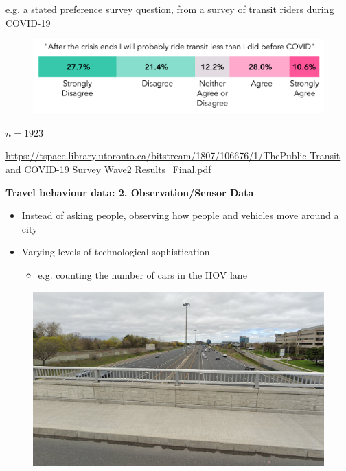 \documentclass[aspectratio=169]{beamer}
\begin{document}
\begin{frame}
	
	e.g. a stated preference survey question, from a survey of transit riders during COVID-19
	\vspace{2mm}
	
	
	\begin{figure}
		\centering
		\includegraphics[width=1\linewidth]{images/covid_transit_pref}
	\end{figure}
	
	\tiny$n = 1923$
	
	\vspace{2mm}
	
	\tiny\url{https://tspace.library.utoronto.ca/bitstream/1807/106676/1/ThePublic Transit and COVID-19 Survey Wave2 Results_Final.pdf}
	
\end{frame}








\begin{frame}
	
	\textbf{Travel behaviour data: 2. Observation/Sensor Data}
	
	\begin{itemize}
		\item Instead of asking people, observing how people and vehicles move around a city
		\item Varying levels of technological sophistication
		
		\begin{itemize}
			\item e.g. counting the number of cars in the HOV lane
		\end{itemize}
		
	\end{itemize}
	
	\begin{figure}
		\centering
		\includegraphics[width=0.7\linewidth]{images/404_bridge.png}
	\end{figure}
	 
\end{frame}
\end{document}
